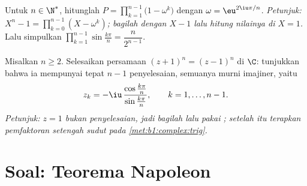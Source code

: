 \begin{exercise}[$\star\star\star$]\label{exo:b1:complex:11}
Untuk $n \in \N^*$, hitunglah $P = \prod_{k=1}^{n-1}
\bigl(1 - \omega^k\bigr)$ dengan $\omega = \eu^{2\iu\pi/n}$.
\emph{Petunjuk: $X^n - 1 = \prod_{k=0}^{n-1} (X - \omega^k)$; bagilah dengan
$X - 1$ lalu hitung nilainya di $X = 1$.} Lalu simpulkan
$\prod_{k=1}^{n-1} \sin\frac{k\pi}{n} = \dfrac{n}{2^{n-1}}$.
\end{exercise}

\begin{exercise}[$\star\star$]\label{exo:b1:complex:12}
Misalkan $n \geq 2$. Selesaikan persamaan $(z + 1)^n = (z - 1)^n$ di $\C$:
tunjukkan bahwa ia mempunyai tepat $n - 1$ penyelesaian, semuanya murni imajiner,
yaitu
\[
z_k = -\iu\,\frac{\cos\frac{k\pi}{n}}{\sin\frac{k\pi}{n}},
\qquad k = 1, \dots, n - 1 .
\]
\emph{Petunjuk: $z = 1$ bukan penyelesaian, jadi bagilah lalu pakai ; setelah itu terapkan pemfaktoran setengah sudut pada
\cref{met:b1:complex:trig}.}
\end{exercise}

\section{Soal: Teorema Napoleon}

